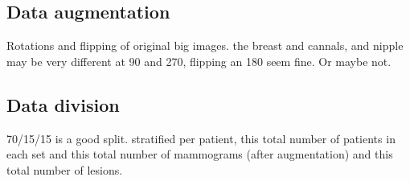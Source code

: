 	
	\subsection{Data augmentation}
	Rotations and flipping of original big images. the breast and cannals, and nipple may be very different at 90 and 270, flipping an 180 seem fine. Or maybe not.


	\subsection{Data division}
	70/15/15 is a good split. stratified per patient, this total number of patients in each set and this total number of mammograms (after augmentation) and this total number of lesions.
